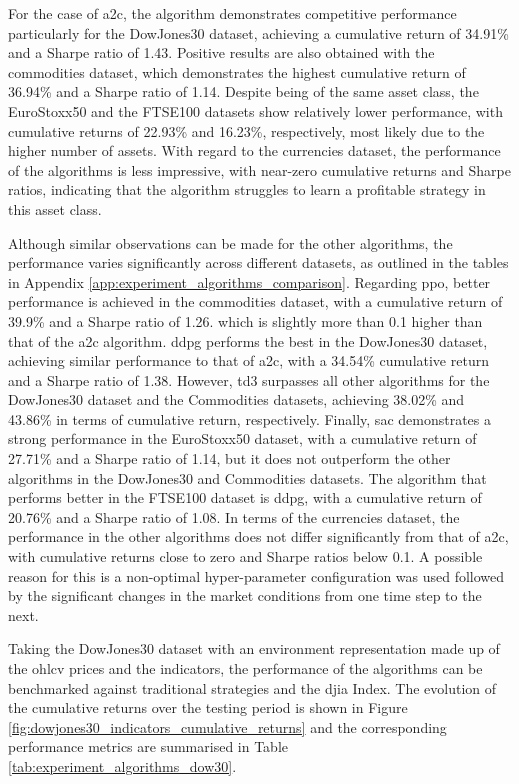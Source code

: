 

For the case of \acrshort{a2c}, the algorithm demonstrates competitive performance particularly for the DowJones30 dataset, achieving a cumulative return of 34.91\% and a Sharpe ratio of 1.43. Positive results are also obtained with the commodities dataset, which demonstrates the highest cumulative return of 36.94\% and a Sharpe ratio of 1.14. Despite being of the same asset class, the EuroStoxx50 and the FTSE100 datasets show relatively lower performance, with cumulative returns of 22.93\% and 16.23\%, respectively, most likely due to the higher number of assets. With regard to the currencies dataset, the performance of the algorithms is less impressive, with near-zero cumulative returns and Sharpe ratios, indicating that the algorithm struggles to learn a profitable strategy in this asset class. 

Although similar observations can be made for the other algorithms, the performance varies significantly across different datasets, as outlined in the tables in Appendix \ref{app:experiment_algorithms_comparison}. Regarding \acrshort{ppo}, better performance is achieved in the commodities dataset, with a cumulative return of 39.9\% and a Sharpe ratio of 1.26. which is slightly more than 0.1 higher than that of the \acrshort{a2c} algorithm. \acrshort{ddpg} performs the best in the DowJones30 dataset, achieving similar performance to that of \acrshort{a2c}, with a 34.54\% cumulative return and a Sharpe ratio of 1.38. However, \acrshort{td3} surpasses all other algorithms for the DowJones30 dataset and the Commodities datasets, achieving 38.02\% and 43.86\% in terms of cumulative return, respectively. Finally, \acrshort{sac} demonstrates a strong performance in the EuroStoxx50 dataset, with a cumulative return of 27.71\% and a Sharpe ratio of 1.14, but it does not outperform the other algorithms in the DowJones30 and Commodities datasets. The algorithm that performs better in the FTSE100 dataset is \acrshort{ddpg}, with a cumulative return of 20.76\% and a Sharpe ratio of 1.08. In terms of the currencies dataset, the performance in the other algorithms does not differ significantly from that of \acrshort{a2c}, with cumulative returns close to zero and Sharpe ratios below 0.1. A possible reason for this is a non-optimal hyper-parameter configuration was used followed by the significant changes in the market conditions from one time step to the next.

Taking the DowJones30 dataset with an environment representation made up of the \acrshort{ohlcv} prices and the indicators, the performance of the algorithms can be benchmarked against traditional strategies and the \acrshort{djia} Index. The evolution of the cumulative returns over the testing period is shown in Figure \ref{fig:dowjones30_indicators_cumulative_returns} and the corresponding performance metrics are summarised in Table \ref{tab:experiment_algorithms_dow30}.

